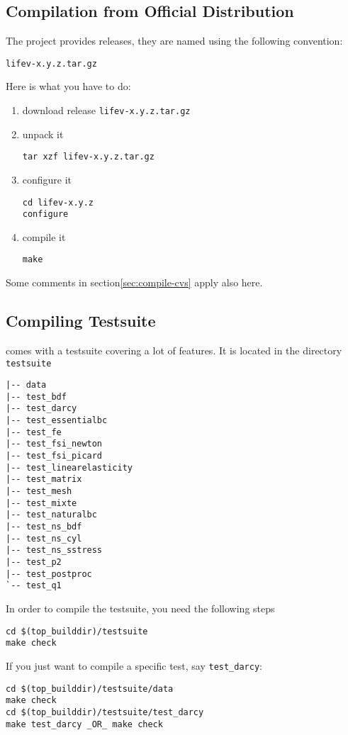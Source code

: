 \subsection{Compilation from Official Distribution}
\label{sec:comp-from-offic}
The \lifev project provides releases, they are named using the following convention:
\begin{center}
\verb!lifev-x.y.z.tar.gz!
\end{center}

Here is what you have to do:

\begin{enumerate}
\item download \lifev release \verb!lifev-x.y.z.tar.gz!
\item unpack it
\begin{verbatim}
tar xzf lifev-x.y.z.tar.gz
\end{verbatim}
\item configure it
\begin{verbatim}
cd lifev-x.y.z
configure
\end{verbatim}
\item compile it
\begin{verbatim}
make
\end{verbatim}
\end{enumerate}

Some comments in section\ref{sec:compile-cvs} apply also here.

\subsection{Compiling Testsuite}

\noindent \lifev comes with a testsuite covering a lot of features. It is located in the directory \verb+testsuite+
\begin{verbatim}
|-- data
|-- test_bdf
|-- test_darcy
|-- test_essentialbc
|-- test_fe
|-- test_fsi_newton
|-- test_fsi_picard
|-- test_linearelasticity
|-- test_matrix
|-- test_mesh
|-- test_mixte
|-- test_naturalbc
|-- test_ns_bdf
|-- test_ns_cyl
|-- test_ns_sstress
|-- test_p2
|-- test_postproc
`-- test_q1
\end{verbatim}

\noindent In order to compile the testsuite, you need the following steps
\begin{verbatim}
cd $(top_builddir)/testsuite
make check
\end{verbatim}

\noindent If you just want to compile a specific test, say \verb+test_darcy+:
\begin{verbatim}
cd $(top_builddir)/testsuite/data
make check
cd $(top_builddir)/testsuite/test_darcy
make test_darcy _OR_ make check
\end{verbatim}

